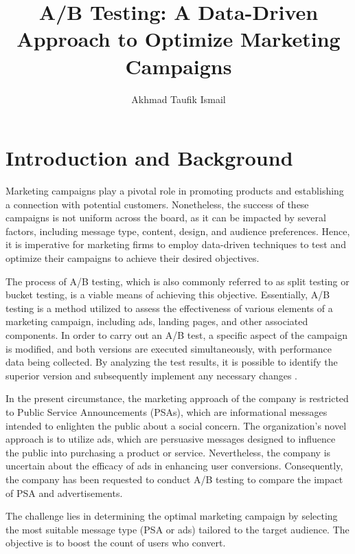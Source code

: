 \documentclass{article}
\begin{document}
\title{A/B Testing: A Data-Driven Approach to Optimize Marketing Campaigns}
\author{Akhmad Taufik Ismail}
\maketitle

\section{Introduction and Background} \par

Marketing campaigns play a pivotal role in promoting products and establishing a connection with potential customers. Nonetheless, the success of these campaigns is not uniform across the board, as it can be impacted by several factors, including message type, content, design, and audience preferences. Hence, it is imperative for marketing firms to employ data-driven techniques to test and optimize their campaigns to achieve their desired objectives. \par

The process of A/B testing, which is also commonly referred to as split testing or bucket testing, is a viable means of achieving this objective. Essentially, A/B testing is a method utilized to assess the effectiveness of various elements of a marketing campaign, including ads, landing pages, and other associated components. In order to carry out an A/B test, a specific aspect of the campaign is modified, and both versions are executed simultaneously, with performance data being collected. By analyzing the test results, it is possible to identify the superior version and subsequently implement any necessary changes \cite{a2019_how}. \par

In the present circumstance, the marketing approach of the company is restricted to Public Service Announcements (PSAs), which are informational messages intended to enlighten the public about a social concern. The organization's novel approach is to utilize ads, which are persuasive messages designed to influence the public into purchasing a product or service. Nevertheless, the company is uncertain about the efficacy of ads in enhancing user conversions. Consequently, the company has been requested to conduct A/B testing to compare the impact of PSA and advertisements. \par

The challenge lies in determining the optimal marketing campaign by selecting the most suitable message type (PSA or ads) tailored to the target audience. The objective is to boost the count of users who convert. \par
\end{document}
